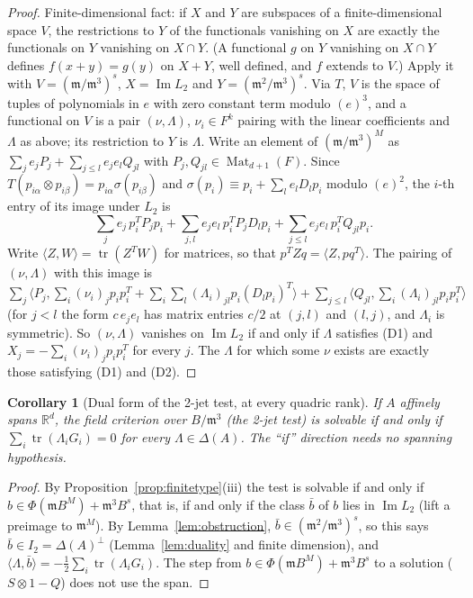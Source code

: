 \documentclass[11pt]{amsart}
\newcommand{\R}{\mathbb{R}}
\DeclareMathOperator{\Mat}{Mat}
\theoremstyle{plain}
\newtheorem{corollary}[theorem]{Corollary}
\theoremstyle{definition}
\begin{document}
\begin{proof}
Finite-dimensional fact: if $X$ and $Y$ are subspaces of a finite-dimensional space $V$, the restrictions
to $Y$ of the functionals vanishing on $X$ are exactly the functionals on $Y$ vanishing on $X\cap Y$. (A
functional $g$ on $Y$ vanishing on $X\cap Y$ defines $f(x+y)=g(y)$ on $X+Y$, well defined, and $f$ extends
to $V$.) Apply it with $V=(\mathfrak m/\mathfrak m^3)^s$, $X=\operatorname{Im}L_2$ and
$Y=(\mathfrak m^2/\mathfrak m^3)^s$. Via $T$, $V$ is the space of tuples of polynomials in $e$ with zero
constant term modulo $(e)^3$, and a functional on $V$ is a pair $(\nu,\Lambda)$, $\nu_i\in F^k$ pairing with
the linear coefficients and $\Lambda$ as above; its restriction to $Y$ is $\Lambda$. Write an element of
$(\mathfrak m/\mathfrak m^3)^M$ as $\sum_je_jP_j+\sum_{j\le l}e_je_lQ_{jl}$ with $P_j,Q_{jl}\in\Mat_{d+1}(F)$.
Since $T(p_{i\alpha}\otimes p_{i\beta})=p_{i\alpha}\sigma(p_{i\beta})$ and
$\sigma(p_i)\equiv p_i+\sum_le_lD_lp_i$ modulo $(e)^2$, the $i$-th entry of its image under $L_2$ is
\[
 \sum_je_j\,p_i^TP_jp_i+\sum_{j,l}e_je_l\,p_i^TP_jD_lp_i+\sum_{j\le l}e_je_l\,p_i^TQ_{jl}p_i .
\]
Write $\langle Z,W\rangle=\operatorname{tr}(Z^TW)$ for matrices, so that $p^TZq=\langle Z,pq^T\rangle$. The
pairing of $(\nu,\Lambda)$ with this image is
$\sum_j\bigl\langle P_j,\sum_i(\nu_i)_jp_ip_i^T+\sum_i\sum_l(\Lambda_i)_{jl}p_i(D_lp_i)^T\bigr\rangle
+\sum_{j\le l}\bigl\langle Q_{jl},\sum_i(\Lambda_i)_{jl}p_ip_i^T\bigr\rangle$ (for $j<l$ the form
$c\,e_je_l$ has matrix entries $c/2$ at $(j,l)$ and $(l,j)$, and $\Lambda_i$ is symmetric). So
$(\nu,\Lambda)$ vanishes on $\operatorname{Im}L_2$ if and only if $\Lambda$ satisfies (D1) and
$X_j=-\sum_i(\nu_i)_jp_ip_i^T$ for every $j$. The $\Lambda$ for which some $\nu$ exists are exactly those
satisfying (D1) and (D2).
\end{proof}

\begin{corollary}[Dual form of the 2-jet test, at every quadric rank]\label{cor:jetdual}
If $A$ affinely spans $\R^d$, the field criterion over $B/\mathfrak m^3$ (the 2-jet test) is solvable if
and only if $\sum_i\operatorname{tr}(\Lambda_iG_i)=0$ for every $\Lambda\in\Delta(A)$. The ``if'' direction
needs no spanning hypothesis.
\end{corollary}

\begin{proof}
By Proposition~\ref{prop:finitetype}(iii) the test is solvable if and only if
$b\in\Phi(\mathfrak mB^M)+\mathfrak m^3B^s$, that is, if and only if the class $\bar b$ of $b$ lies in
$\operatorname{Im}L_2$ (lift a preimage to $\mathfrak m^M$). By Lemma~\ref{lem:obstruction},
$\bar b\in(\mathfrak m^2/\mathfrak m^3)^s$, so this says $\bar b\in I_2=\Delta(A)^\perp$
(Lemma~\ref{lem:duality} and finite dimension), and $\langle\Lambda,\bar b\rangle=-\tfrac12\sum_i
\operatorname{tr}(\Lambda_iG_i)$. The step from $b\in\Phi(\mathfrak mB^M)+\mathfrak m^3B^s$ to a solution
($S\otimes1-Q$) does not use the span.
\end{proof}
\end{document}
